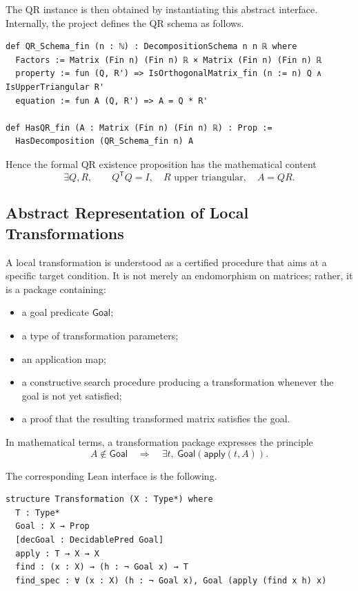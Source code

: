 \documentclass[pdflatex,sn-mathphys-num]{sn-jnl}%
\theoremstyle{thmstyleone}%
\theoremstyle{thmstyletwo}%
\theoremstyle{thmstylethree}%
\begin{document}
The QR instance is then obtained by instantiating this abstract interface.  Internally, the project defines the QR schema as follows.

\begin{lstlisting}
def QR_Schema_fin (n : ℕ) : DecompositionSchema n n ℝ where
  Factors := Matrix (Fin n) (Fin n) ℝ × Matrix (Fin n) (Fin n) ℝ
  property := fun (Q, R') => IsOrthogonalMatrix_fin (n := n) Q ∧ IsUpperTriangular R'
  equation := fun A (Q, R') => A = Q * R'

def HasQR_fin (A : Matrix (Fin n) (Fin n) ℝ) : Prop :=
  HasDecomposition (QR_Schema_fin n) A
\end{lstlisting}

Hence the formal QR existence proposition has the mathematical content
\[
\exists Q,R,\qquad Q^{\mathsf T}Q=I,\quad R\text{ upper triangular},\quad A=QR.
\]

\subsection{Abstract Representation of Local Transformations}

A local transformation is understood as a certified procedure that aims at a specific target condition.  It is not merely an endomorphism on matrices; rather, it is a package containing:

\begin{itemize}
\item a goal predicate \(\mathsf{Goal}\);
\item a type of transformation parameters;
\item an application map;
\item a constructive search procedure producing a transformation whenever the goal is not yet satisfied;
\item a proof that the resulting transformed matrix satisfies the goal.
\end{itemize}

In mathematical terms, a transformation package expresses the principle
\[
A \notin \mathsf{Goal}
\quad\Longrightarrow\quad
\exists t,\ \mathsf{Goal}(\mathsf{apply}(t,A)).
\]

The corresponding Lean interface is the following.

\begin{lstlisting}
structure Transformation (X : Type*) where
  T : Type*
  Goal : X → Prop
  [decGoal : DecidablePred Goal]
  apply : T → X → X
  find : (x : X) → (h : ¬ Goal x) → T
  find_spec : ∀ (x : X) (h : ¬ Goal x), Goal (apply (find x h) x)
\end{lstlisting}
\end{document}
